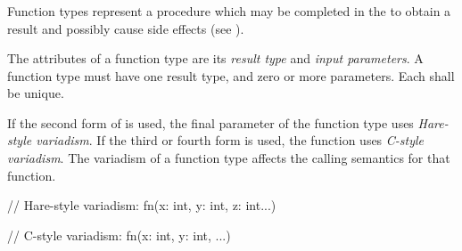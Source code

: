\begin{grammar}
 \\
	  \\

 \\
	\terminal{(}  \terminal{)}  \\

 \\
	 \optional{\terminal{,}} \\
	  \\
	 \terminal{,}  \\
	 \\

 \\
	 \\
	 \terminal{,}  \\

 \\
	 \terminal{:}  \\
	 \\
\end{grammar}

\specsubsubitem
Function types represent a procedure which may be completed in the
 to obtain a result and possibly cause side
effects (see ).

\specsubsubitem
The attributes of a function type are its \textit{result type} and
\textit{input parameters}. A function type must have one result type, and zero
or more parameters. Each  shall be unique.

\specsubsubitem
If the second form of  is used, the final parameter of
the function type uses \textit{Hare-style variadism}. If the third or fourth
form is used, the function uses \textit{C-style variadism}. The variadism of a
function type affects the calling semantics for that function.

\begin{codesample}
// Hare-style variadism:
fn(x: int, y: int, z: int...)

// C-style variadism:
fn(x: int, y: int, ...)
\end{codesample}

